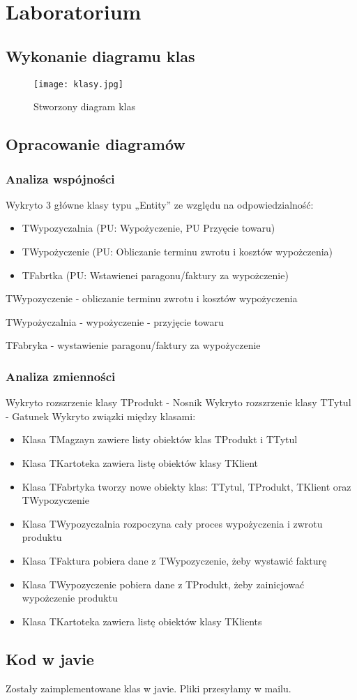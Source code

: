 \documentclass{article}
\begin{document}
	\section{Laboratorium}
	\subsection{Wykonanie diagramu klas}
\begin{figure}[!ht]
	\centering
	\texttt{[image: klasy.jpg]}
	\caption{Stworzony diagram klas}
	\label{fig:obrazek 1}
\end{figure}
	\newpage
	\subsection{Opracowanie diagramów}
	\subsubsection{Analiza wspójności}
	Wykryto 3 główne klasy typu „Entity” ze względu na odpowiedzialność:
	\begin{itemize}
	\item TWypozyczalnia (PU: Wypożyczenie, PU Przyęcie towaru)
	\item TWypożyczenie (PU: Obliczanie terminu zwrotu i kosztów wypożczenia)
	\item TFabrtka (PU: Wstawienei paragonu/faktury za wypożczenie)
	\end{itemize}	
TWypozyczenie
- obliczanie terminu zwrotu i kosztów wypożyczenia

TWypożyczalnia
- wypożyczenie
- przyjęcie towaru

TFabryka
- wystawienie paragonu/faktury za wypożyczenie
\subsubsection{Analiza zmienności}
Wykryto rozszrzenie klasy TProdukt - Nosnik
Wykryto rozszrzenie klasy TTytul - Gatunek
Wykryto związki między klasami:
\begin{itemize}
	\item Klasa TMagzayn zawiere listy obiektów klas TProdukt i TTytul
	\item Klasa TKartoteka zawiera listę obiektów klasy TKlient
	\item Klasa TFabrtyka tworzy nowe obiekty klas: TTytul, TProdukt, TKlient oraz TWypozyczenie
	\item Klasa TWypozyczalnia rozpoczyna cały proces wypożyczenia i zwrotu produktu
	\item Klasa TFaktura pobiera dane z TWypozyczenie, żeby wystawić fakturę
	\item Klasa TWypozyczenie pobiera dane z TProdukt, żeby zainicjować wypożczenie produktu
	\item Klasa TKartoteka zawiera listę obiektów klasy TKlients
\end{itemize}	
\subsection{Kod w javie}
Zostały zaimplementowane klas w javie. Pliki przesyłamy w mailu.
\end{document}
